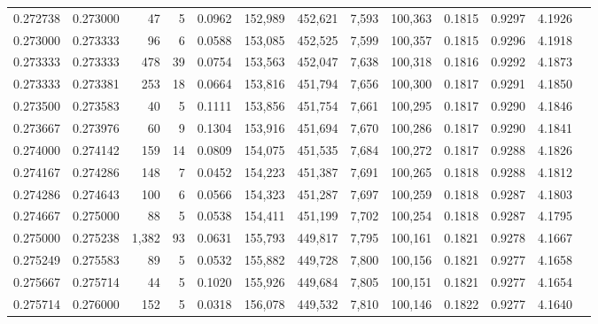 \begin{tabular}{rrrrrrrrrrrrr}
0.272738 & 0.273000 &    47 &   5 &                                     0.0962 & 152,989 & 452,621 &   7,593 & 100,363 & 0.1815 & 0.9297 & 4.1926 \\
0.273000 & 0.273333 &    96 &   6 &                                     0.0588 & 153,085 & 452,525 &   7,599 & 100,357 & 0.1815 & 0.9296 & 4.1918 \\
0.273333 & 0.273333 &   478 &  39 &                                     0.0754 & 153,563 & 452,047 &   7,638 & 100,318 & 0.1816 & 0.9292 & 4.1873 \\
0.273333 & 0.273381 &   253 &  18 &                                     0.0664 & 153,816 & 451,794 &   7,656 & 100,300 & 0.1817 & 0.9291 & 4.1850 \\
0.273500 & 0.273583 &    40 &   5 &                                     0.1111 & 153,856 & 451,754 &   7,661 & 100,295 & 0.1817 & 0.9290 & 4.1846 \\
0.273667 & 0.273976 &    60 &   9 &                                     0.1304 & 153,916 & 451,694 &   7,670 & 100,286 & 0.1817 & 0.9290 & 4.1841 \\
0.274000 & 0.274142 &   159 &  14 &                                     0.0809 & 154,075 & 451,535 &   7,684 & 100,272 & 0.1817 & 0.9288 & 4.1826 \\
0.274167 & 0.274286 &   148 &   7 &                                     0.0452 & 154,223 & 451,387 &   7,691 & 100,265 & 0.1818 & 0.9288 & 4.1812 \\
0.274286 & 0.274643 &   100 &   6 &                                     0.0566 & 154,323 & 451,287 &   7,697 & 100,259 & 0.1818 & 0.9287 & 4.1803 \\
0.274667 & 0.275000 &    88 &   5 &                                     0.0538 & 154,411 & 451,199 &   7,702 & 100,254 & 0.1818 & 0.9287 & 4.1795 \\
0.275000 & 0.275238 & 1,382 &  93 &                                     0.0631 & 155,793 & 449,817 &   7,795 & 100,161 & 0.1821 & 0.9278 & 4.1667 \\
0.275249 & 0.275583 &    89 &   5 &                                     0.0532 & 155,882 & 449,728 &   7,800 & 100,156 & 0.1821 & 0.9277 & 4.1658 \\
0.275667 & 0.275714 &    44 &   5 &                                     0.1020 & 155,926 & 449,684 &   7,805 & 100,151 & 0.1821 & 0.9277 & 4.1654 \\
0.275714 & 0.276000 &   152 &   5 &                                     0.0318 & 156,078 & 449,532 &   7,810 & 100,146 & 0.1822 & 0.9277 & 4.1640 \\

\end{tabular}
